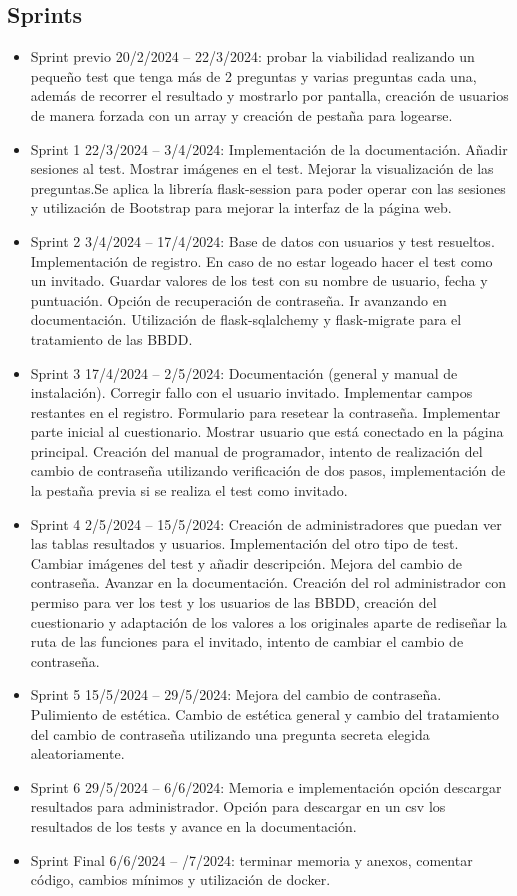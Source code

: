 \subsection{Sprints}
 \begin{itemize}
    \item Sprint previo 20/2/2024 – 22/3/2024: probar la viabilidad realizando un pequeño test que tenga más de 2 preguntas y varias preguntas cada una, además de recorrer el resultado y mostrarlo por pantalla, creación de usuarios de manera forzada con un array y creación de pestaña para logearse.
    \item Sprint 1 22/3/2024 – 3/4/2024: Implementación de la documentación. Añadir sesiones al test. Mostrar imágenes en el test. Mejorar la visualización de las preguntas.Se aplica la librería flask-session para poder operar con las sesiones y utilización de Bootstrap para mejorar la interfaz de la página web.
    \item Sprint 2 3/4/2024 – 17/4/2024: Base de datos con usuarios y test resueltos. Implementación de registro. En caso de no estar logeado hacer el test como un invitado. Guardar valores de los test con su nombre de usuario, fecha y puntuación. Opción de recuperación de contraseña. Ir avanzando en documentación. Utilización de flask-sqlalchemy y flask-migrate para el tratamiento de las BBDD.
    \item Sprint 3 17/4/2024 – 2/5/2024: Documentación (general y manual de instalación). Corregir fallo con el usuario invitado. Implementar campos restantes en el registro. Formulario para resetear la contraseña. Implementar parte inicial al cuestionario. Mostrar usuario que está conectado en la página principal. Creación del manual de programador, intento de realización del cambio de contraseña utilizando verificación de dos pasos, implementación de la pestaña previa si se realiza el test como invitado.
    \item Sprint 4 2/5/2024 – 15/5/2024: Creación de administradores que puedan ver las tablas resultados y usuarios. Implementación del otro tipo de test. Cambiar imágenes del test y añadir descripción. Mejora del cambio de contraseña. Avanzar en la documentación. Creación del rol administrador con permiso para ver los test y los usuarios de las BBDD, creación del cuestionario y adaptación de los valores a los originales aparte de rediseñar la ruta de las funciones para el invitado, intento de cambiar el cambio de contraseña.
    \item Sprint 5 15/5/2024 – 29/5/2024: Mejora del cambio de contraseña. Pulimiento de estética. Cambio de estética general y cambio del tratamiento del cambio de contraseña utilizando una pregunta secreta elegida aleatoriamente.
    \item Sprint 6 29/5/2024 – 6/6/2024: Memoria e implementación opción descargar resultados para administrador. Opción para descargar en un csv los resultados de los tests y avance en la documentación.
    \item Sprint Final 6/6/2024 – /7/2024: terminar memoria y anexos, comentar código, cambios mínimos y utilización de docker.
\end{itemize}
